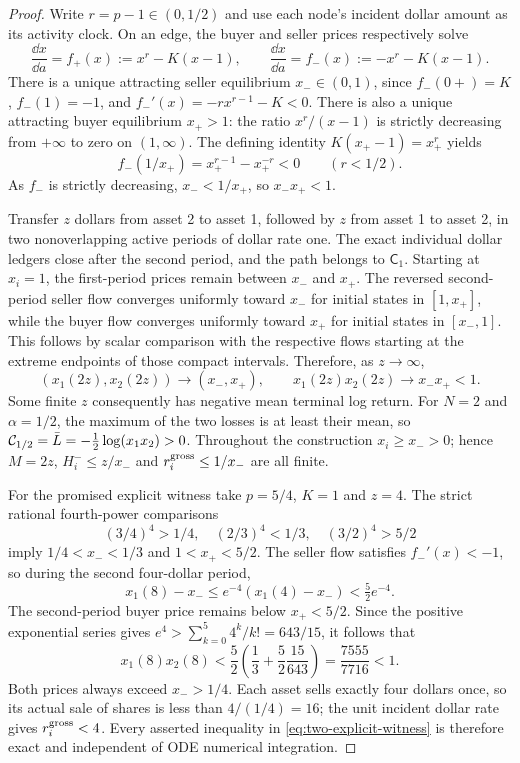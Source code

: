 \documentclass[review,hidelinks,onefignum,onetabnum]{siamonline250211}%
\begin{document}
\begin{proof}
Write $r=p-1\in(0,1/2)$ and use each node's
incident dollar amount as its activity clock. On an edge,
the buyer and seller prices respectively solve
\[
 \frac{\dd x}{\dd a}=f_+(x):=x^r-K(x-1),
 \qquad
 \frac{\dd x}{\dd a}=f_-(x):=-x^r-K(x-1).
\]
There is a unique attracting seller equilibrium
$x_-\in(0,1)$, since $f_-(0+)=K$, $f_-(1)=-1$,
and $f_-'(x)=-r x^{r-1}-K<0$.
There is also a unique attracting buyer equilibrium
$x_+>1$: the ratio $x^r/(x-1)$ is strictly
decreasing from $+\infty$ to zero on $(1,\infty)$.
The defining identity $K(x_+-1)=x_+^r$ yields
\[
 f_-(1/x_+)
 =x_+^{r-1}-x_+^{-r}<0
 \qquad (r<1/2).
\]
As $f_-$ is strictly decreasing, $x_-<1/x_+$,
so $x_-x_+<1$.

Transfer $z$ dollars from asset 2 to asset 1, followed
by $z$ from asset 1 to asset 2, in two nonoverlapping
active periods of dollar rate one. The exact individual
dollar ledgers close after the second period, and the
path belongs to $\mathsf C_1$. Starting at $x_i=1$,
the first-period prices remain between $x_-$ and $x_+$.
The reversed second-period seller flow converges
uniformly toward $x_-$ for initial states in
$[1,x_+]$, while the buyer flow converges uniformly
toward $x_+$ for initial states in $[x_-,1]$.
This follows by scalar comparison with the respective
flows starting at the extreme endpoints of those compact
intervals. Therefore, as $z\to\infty$,
\[
 (x_1(2z),x_2(2z))\longrightarrow(x_-,x_+),
 \qquad x_1(2z)x_2(2z)\longrightarrow x_-x_+<1.
\]
Some finite $z$ consequently has negative mean terminal
log return. For $N=2$ and $\alpha=1/2$, the maximum of
the two losses is at least their mean, so
$\mathcal{C}_{1/2}=\bar L=-\frac12\log(x_1x_2)>0$.
Throughout the construction $x_i\ge x_->0$; hence
$M=2z$, $H_i^-\le z/x_-$ and
$r_i^{\rm gross}\le1/x_-$ are all finite.

For the promised explicit witness take $p=5/4$, $K=1$
and $z=4$. The strict rational fourth-power comparisons
\[
 (3/4)^4>1/4,\quad (2/3)^4<1/3,\quad
 (3/2)^4>5/2
\]
imply $1/4<x_-<1/3$ and $1<x_+<5/2$.
The seller flow satisfies $f_-'(x)<-1$, so
during the second four-dollar period,
\[
 x_1(8)-x_-\le
 e^{-4}(x_1(4)-x_-)<\tfrac52 e^{-4}.
\]
The second-period buyer price remains below $x_+<5/2$.
Since the positive exponential series gives
$e^4>\sum_{k=0}^{5}4^k/k!=643/15$, it follows that
\[
 x_1(8)x_2(8)
 <\frac52\left(\frac13+\frac52\frac{15}{643}\right)
 =\frac{7555}{7716}<1.
\]
Both prices always exceed $x_->1/4$. Each asset
sells exactly four dollars once, so its actual sale of
shares is less than $4/(1/4)=16$; the unit incident
dollar rate gives $r_i^{\rm gross}<4$.
Every asserted inequality in \eqref{eq:two-explicit-witness}
is therefore exact and independent of ODE numerical
integration.
\end{proof}
\end{document}
